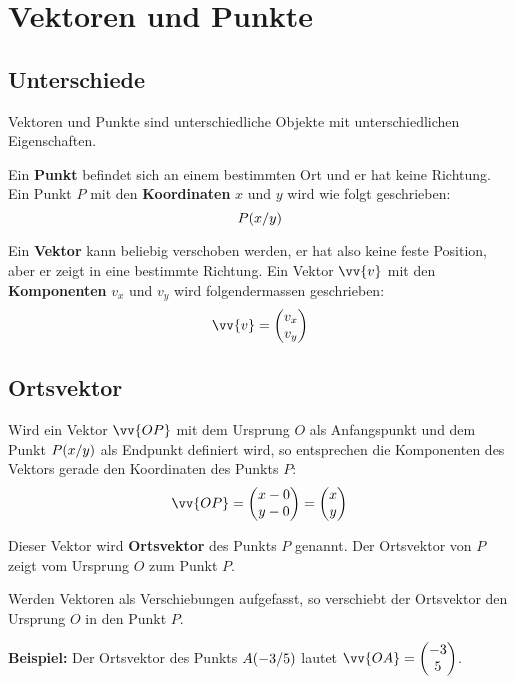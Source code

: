 \newpage
\section{Vektoren und Punkte}

\subsection{Unterschiede}
Vektoren und Punkte sind unterschiedliche Objekte mit unterschiedlichen Eigenschaften.

Ein \textbf{Punkt} befindet sich an einem bestimmten Ort und er hat keine Richtung. Ein Punkt $P$ mit den \textbf{Koordinaten} $x$ und $y$ wird wie folgt geschrieben:
\[
  \pxy[P]{x,y}
\]

Ein \textbf{Vektor} kann beliebig verschoben werden, er hat also keine feste Position, aber er zeigt in eine bestimmte Richtung. Ein Vektor $\vv{v}$ mit den \textbf{Komponenten} $v_{x}$ und $v_{y}$ wird folgendermassen geschrieben:
\[
  \vv{v} = \vxy{v_{x},v_{y}}
\]

\subsection{Ortsvektor}

Wird ein Vektor $\vv{OP}$ mit dem Ursprung $O$ als Anfangspunkt und dem Punkt $\pxy[P]{x,y}$ als Endpunkt definiert wird, so entsprechen die Komponenten des Vektors gerade den Koordinaten des Punkts $P$:
\[
  \vv{OP} = \vxy{x-0,y-0} = \vxy{x,y}
\]
\begin{center}
\end{center}

Dieser Vektor wird \textbf{Ortsvektor} des Punkts $P$ genannt. Der Ortsvektor von $P$ zeigt vom Ursprung $O$ zum Punkt $P$.

Werden Vektoren als Verschiebungen aufgefasst, so verschiebt der Ortsvektor den Ursprung $O$ in den Punkt $P$.
\begin{example}
  \textbf{Beispiel:} Der Ortsvektor des Punkts $\pxy[A]{-3,5}$ lautet $\vv{OA} = \vxy{-3,5}$.
\end{example}

